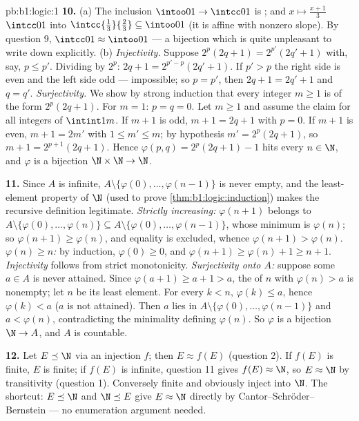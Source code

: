\begin{solution}{pb:b1:logic:1}
\textbf{10.} (a) The inclusion $\intoo01 \to \intcc01$ is ;
and $x \mapsto \frac{x + 1}3$  $\intcc01$  into
$\intcc{\frac13}{\frac23} \subseteq \intoo01$ (it is affine with
nonzero slope). By question 9, $\intcc01 \approx \intoo01$ --- a
bijection which is quite unpleasant to write down explicitly.
(b) \emph{Injectivity.} Suppose $2^p(2q + 1) = 2^{p'}(2q' + 1)$ with,
say, $p \leq p'$. Dividing by $2^p$: $2q + 1 = 2^{p' - p}(2q' + 1)$.
If $p' > p$ the right side is even and the left side odd ---
impossible; so $p = p'$, then $2q + 1 = 2q' + 1$ and $q = q'$.
\emph{Surjectivity.} We show by strong induction that every integer
$m \geq 1$ is of the form $2^p(2q + 1)$. For $m = 1$: $p = q = 0$.
Let $m \geq 1$ and assume the claim for all integers of
$\intint1m$. If $m + 1$ is odd, $m + 1 = 2q + 1$ with $p = 0$. If
$m + 1$ is even, $m + 1 = 2m'$ with $1 \leq m' \leq m$; by
hypothesis $m' = 2^p(2q + 1)$, so $m + 1 = 2^{p+1}(2q + 1)$. Hence
$\varphi(p, q) = 2^p(2q + 1) - 1$ hits every $n \in \N$, and
$\varphi$ is a bijection $\N \times \N \to \N$.

\textbf{11.} Since $A$ is infinite, $A \setminus \{\varphi(0), \dots,
\varphi(n - 1)\}$ is never empty, and the least-element property of
$\N$ (used to prove \cref{thm:b1:logic:induction}) makes the
recursive definition legitimate. \emph{Strictly increasing:}
$\varphi(n + 1)$ belongs to $A \setminus \{\varphi(0), \dots,
\varphi(n)\} \subseteq A \setminus \{\varphi(0), \dots, \varphi(n -
1)\}$, whose minimum is $\varphi(n)$; so $\varphi(n + 1) \geq
\varphi(n)$, and equality is excluded, whence $\varphi(n+1) >
\varphi(n)$. \emph{$\varphi(n) \geq n$:} by induction, $\varphi(0)
\geq 0$, and $\varphi(n + 1) \geq \varphi(n) + 1 \geq n + 1$.
\emph{Injectivity} follows from strict monotonicity.
\emph{Surjectivity onto $A$:} suppose some $a \in A$ is never
attained. Since $\varphi(a + 1) \geq a + 1 > a$, the  of $n$ with
$\varphi(n) > a$ is nonempty; let $n$ be its least element. For every
$k < n$, $\varphi(k) \leq a$, hence $\varphi(k) < a$ ($a$ is not
attained). Then $a$ lies in $A \setminus \{\varphi(0), \dots,
\varphi(n - 1)\}$ and $a < \varphi(n)$, contradicting the minimality
defining $\varphi(n)$. So $\varphi$ is a bijection $\N \to A$, and
$A$ is countable.

\textbf{12.} Let $E \preceq \N$ via an injection $f$; then $E \approx
f(E)$ (question 2). If $f(E)$ is finite, $E$ is finite; if $f(E)$ is
infinite, question 11 gives $f(E) \approx \N$, so $E \approx \N$ by
transitivity (question 1). Conversely finite  and 
obviously inject into $\N$. The shortcut: $E \preceq \N$ and $\N
\preceq E$ give $E \approx \N$ directly by
Cantor--Schr\"oder--Bernstein --- no enumeration argument needed.


\end{solution}
